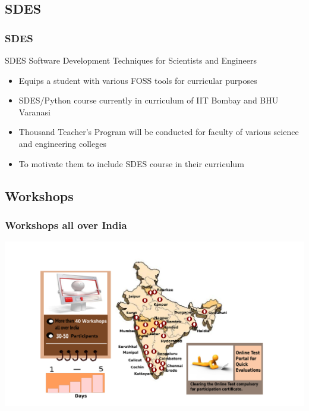 \documentclass[compress,red]{beamer} %
\begin{document}
\subsection{SDES}
\begin{frame}
\frametitle{SDES}
\begin{block}{SDES}
Software Development Techniques for Scientists and Engineers
\end{block}
\begin{itemize}
\item Equips a student with various FOSS tools for curricular purposes \pause
\item SDES/Python course currently in curriculum of IIT Bombay and BHU Varanasi \pause
\item Thousand Teacher's Program will be conducted for faculty of various science and engineering colleges \pause
\item To motivate them to include SDES course in their curriculum
\end{itemize}
\end{frame}



\subsection{Workshops}
\begin{frame}
\frametitle{Workshops all over India}
\includegraphics[scale=.15]{workshop.png}
\end{frame}
\end{document}
